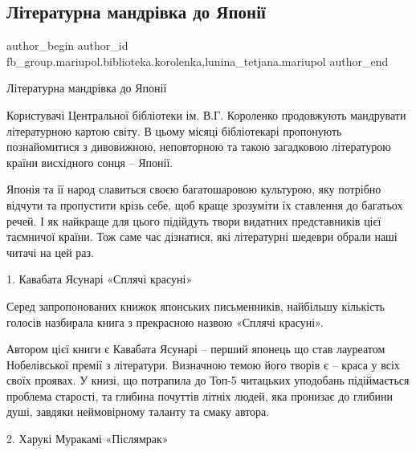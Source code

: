  
 
 
 
 

\subsection{Літературна мандрівка до Японії}
\label{sec:30_06_2018.fb.fb_group.mariupol.biblioteka.korolenka.2.l_teraturna_mandr_vk}
 
\ifcmt
 author_begin
   author_id fb_group.mariupol.biblioteka.korolenka,lunina_tetjana.mariupol
 author_end
\fi

Літературна мандрівка до Японії

Користувачі Центральної бібліотеки ім. В.Г. Короленко продовжують мандрувати
літературною картою світу. В цьому місяці бібліотекарі пропонують познайомитися
з дивовижною, неповторною та такою загадковою літературою країни висхідного
сонця – Японії.

Японія та її народ славиться своєю багатошаровою культурою, яку потрібно
відчути та пропустити крізь себе, щоб краще зрозуміти їх ставлення до багатьох
речей.  І як найкраще для цього підійдуть твори видатних представників цієї
таємничої країни. Тож саме час дізнатися, які літературні шедеври обрали наші
читачі на цей раз.

1. Кавабата Ясунарі «Сплячі красуні»

Серед запропонованих книжок японських письменників, найбільшу кількість голосів
назбирала книга з прекрасною назвою «Сплячі красуні». 

Автором цієї книги є Кавабата Ясунарі – перший японець що став лауреатом
Нобелівської премії з літератури. Визначною темою його творів є – краса у всіх
своїх проявах. У книзі, що потрапила до Топ-5 читацьких уподобань підіймається
проблема старості, та глибина почуттів літніх людей, яка пронизає до глибини
душі, завдяки неймовірному таланту та смаку автора. 

2. Харукі Муракамі «Післямрак»


